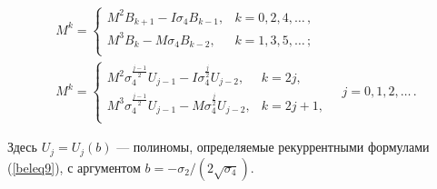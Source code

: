 \begin{gather}

M^k=\begin{cases}

M^2B_{k+1}-I\sigma_4B_{k-1}, & k = 0, 2, 4, \dots\, ,\\

M^3B_k-M\sigma_4B_{k-2}, & k = 1, 3, 5, \dots\, ;\\

\end{cases}\label{beleq15}\\	

\label{beleq16}

M^k=\begin{cases}

M^2\sigma_4^{\frac{j-1}{2}}U_{j-1}-I\sigma_4^{\frac{j}{2}}U_{j-2}, & k=2j,\\

M^3\sigma_4^{\frac{j-1}{2}}U_{j-1}-M\sigma_4^{\frac{j}{2}}U_{j-2}, & k=2j+1,\\

\end{cases} \quad 

j=0, 1, 2, \dots\,. 

\end{gather}

Здесь $U_j=U_j(b)$ --- полиномы, определяемые рекуррентными формулами (\ref{beleq9}), с аргументом $b=-{\sigma_2}/({2\sqrt{\sigma_4}}).$



\smallskip



